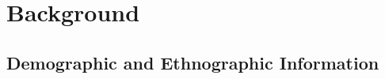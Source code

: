 \documentclass[grammar]{subfiles}
\begin{document}
	\chapter{Background}
	\label{ch:background}

	\section{Demographic and Ethnographic Information}

	\ToBeWritten
\end{document}
